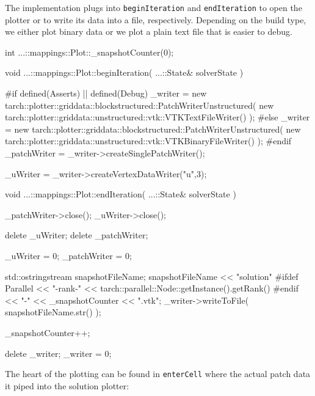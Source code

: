\noindent
The implementation plugs into \texttt{beginIteration} and \texttt{endIteration}
to open the plotter or to write its data into a file, respectively.
Depending on the build type, we either plot binary data or we plot a plain text
file that is easier to debug.

\begin{code}
int ...::mappings::Plot::_snapshotCounter(0);

void ...::mappings::Plot::beginIteration(
  ...::State&  solverState
) {
  #if defined(Asserts) || defined(Debug)
  _writer = new tarch::plotter::griddata::blockstructured::PatchWriterUnstructured( 
    new tarch::plotter::griddata::unstructured::vtk::VTKTextFileWriter() );
  #else
  _writer = new tarch::plotter::griddata::blockstructured::PatchWriterUnstructured( 
    new tarch::plotter::griddata::unstructured::vtk::VTKBinaryFileWriter() );
  #endif
  _patchWriter            = _writer->createSinglePatchWriter();

  _uWriter         = _writer->createVertexDataWriter("u",3);
}


void ...::mappings::Plot::endIteration(
  ...::State&  solverState
) {
  _patchWriter->close();
  _uWriter->close();

  delete _uWriter;
  delete _patchWriter;

  _uWriter = 0;
  _patchWriter = 0;

  std::ostringstream snapshotFileName;
  snapshotFileName << "solution"
                   #ifdef Parallel
                   << "-rank-" << tarch::parallel::Node::getInstance().getRank()
                   #endif
                   << "-" << _snapshotCounter
                   << ".vtk";
  _writer->writeToFile( snapshotFileName.str() );

  _snapshotCounter++;

  delete _writer;
  _writer = 0;
}
\end{code}

\noindent
The heart of the plotting can be found in \texttt{enterCell} where the
actual patch data it piped into the solution plotter:


